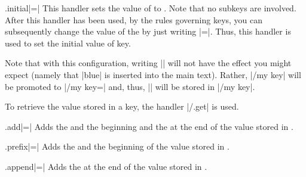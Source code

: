 \begin{handler}{{.initial}|=|}
  This handler sets the value of  to . Note that
  no subkeys are involved. After this handler has been used, by the
  rules governing keys, you can subsequently change the value of the
   by just writing |=|. Thus, this
  handler is used to set the initial value of key.

\begin{codeexample}
\end{codeexample}

  Note that with this configuration, writing || will not
  have the effect you might expect (namely that |blue| is inserted
  into the main text). Rather, |/my key| will be promoted to
  |/my key=\pgfkeysnovalue| and, thus, |\pgfkeysnovalue| will be
  stored in |/my key|.

  To retrieve the value stored in a key, the handler |/.get| is used.
\end{handler}


\begin{handler}{{.add}|=|}
  Adds the  and the beginning and the  at the end of the value stored in .
\end{handler}

\begin{handler}{{.prefix}|=|}
  Adds the  and the beginning of the value stored in .
\end{handler}

\begin{handler}{{.append}|=|}
  Adds the  at the end of the value stored in .
\end{handler}

